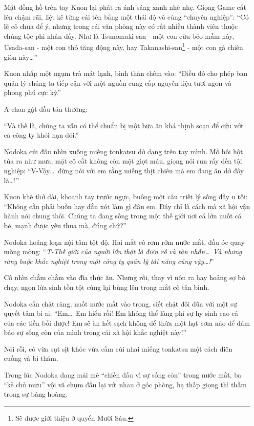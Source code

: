 \documentclass[../main.tex]{subfiles}
\begin{document}
Mặt đồng hồ trên tay Kuon lại phát ra ánh sáng xanh nhè nhẹ. Giọng Game cất lên chậm rãi, liệt kê từng cái tên bằng một thái độ vô cùng ``chuyên nghiệp'': ``Có lẽ cô chưa để ý, nhưng trong cái văn phòng này có rất nhiều thành viên thuộc chủng tộc phi nhân đấy. Như là Tsunomaki-san - một con cừu béo mầm này, Usada-san - một con thỏ tăng động này, hay Takanashi-san\footnote{Sẽ được giới thiệu ở quyển Mười Sáu.} - một con gà chiên giòn này\dots''

Kuon nhấp một ngụm trà mát lạnh, bình thản chêm vào: ``Điều đó cho phép ban quản lý chúng ta tiếp cận với một nguồn cung cấp nguyên liệu tươi ngon và phong phú cực kỳ.''

A-chan gật đầu tán thưởng:

``Và thế là, chúng ta vẫn có thể chuẩn bị một bữa ăn khá thịnh soạn để cứu vớt cả công ty khỏi nạn đói.''

Nodoka cúi đầu nhìn xuống miếng tonkatsu dở dang trên tay mình. Mồ hôi hột túa ra như mưa, mặt cô cắt không còn một giọt máu, giọng nói run rẩy đến tội nghiệp: ``V-Vậy\dots\ đừng nói với em rằng miếng thịt chiên mà em đang ăn dở đây là\dots!''

Kuon khẽ thở dài, khoanh tay trước ngực, buông một câu triết lý sống đầy u tối: ``Không cần phải buồn hay dằn xót làm gì đâu em. Đây chỉ là cách mà xã hội vận hành nói chung thôi. Chúng ta đang sống trong một thế giới nơi cá lớn nuốt cá bé, mạnh được yếu thua mà, đúng chứ?''

Nodoka hoảng loạn nội tâm tột độ. Hai mắt cô rơm rớm nước mắt, đầu óc quay mòng mòng: ``\textit{T-Thế giới của người lớn thật là điên rồ và tàn nhẫn\dots\ Và những ràng buộc khắc nghiệt trong một công ty quản lý tài năng cũng vậy\dots!}''

Cô nhìn chằm chằm vào đĩa thức ăn. Nhưng rồi, thay vì nôn ra hay hoảng sợ bỏ chạy, ngọn lửa sinh tồn tột cùng lại bùng lên trong mắt cô tân binh.

Nodoka cắn chặt răng, nuốt nước mắt vào trong, siết chặt đôi đũa với một sự quyết tâm bi ai: ``Em\dots\ Em hiểu rồi! Em không thể lãng phí sự hy sinh cao cả của các tiền bối được! Em sẽ ăn hết sạch không để thừa một hạt cơm nào để đảm bảo sự sống còn của mình trong cái xã hội khắc nghiệt này!''

Nói rồi, cô vừa sụt sịt khóc vừa cắm cúi nhai miếng tonkatsu một cách điên cuồng và bi thảm.

Trong lúc Nodoka đang mải mê ``chiến đấu vì sự sống còn'' trong nước mắt, ba ``kẻ chủ mưu'' vội vã chụm đầu lại với nhau ở góc phòng, hạ thấp giọng thì thầm trong sự bàng hoàng.
\end{document}

